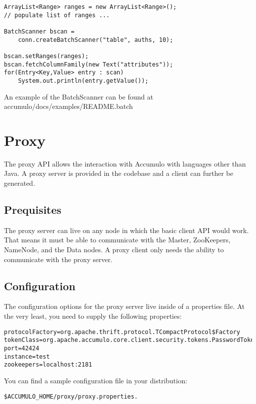 \small
\begin{verbatim}
ArrayList<Range> ranges = new ArrayList<Range>();
// populate list of ranges ...

BatchScanner bscan =
    conn.createBatchScanner("table", auths, 10);

bscan.setRanges(ranges);
bscan.fetchColumnFamily(new Text("attributes"));
for(Entry<Key,Value> entry : scan)
    System.out.println(entry.getValue());
\end{verbatim}
\normalsize

An example of the BatchScanner can be found at\\
accumulo/docs/examples/README.batch

\section{Proxy}

The proxy API allows the interaction with Accumulo with languages other than Java.
A proxy server is provided in the codebase and a client can further be generated.

\subsection{Prequisites}

The proxy server can live on any node in which the basic client API would work. That
means it must be able to communicate with the Master, ZooKeepers, NameNode, and the
Data nodes. A proxy client only needs the ability to communicate with the proxy server.


\subsection{Configuration}

The configuration options for the proxy server live inside of a properties file. At
the very least, you need to supply the following properties:

\small
\begin{verbatim}
protocolFactory=org.apache.thrift.protocol.TCompactProtocol$Factory
tokenClass=org.apache.accumulo.core.client.security.tokens.PasswordToken
port=42424
instance=test
zookeepers=localhost:2181
\end{verbatim}
\normalsize

You can find a sample configuration file in your distribution:

\small
\begin{verbatim}
$ACCUMULO_HOME/proxy/proxy.properties.
\end{verbatim}
\normalsize

